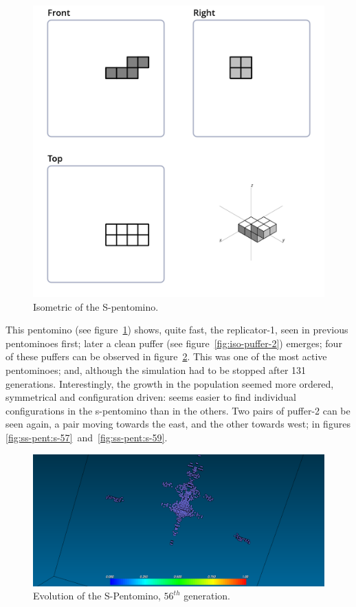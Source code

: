 \begin{figure}[H]
	\centering
	\includegraphics[scale=0.3]{iso_diagrams/s.png}
	\caption{Isometric of the S-pentomino.}
	\label{fig:iso-pent-s}
\end{figure}

This pentomino (see figure~\ref{fig:iso-pent-s}) shows, quite fast, the
replicator-1, seen in previous pentominoes first; later a clean puffer
(see figure~\ref{fig:iso-puffer-2}) emerges; four of these puffers can be
observed in figure~\ref{fig:ss-pent:s-56}. This was one of the most active
pentominoes; and, although the simulation had to be stopped after 131
generations. Interestingly, the growth in the population seemed more ordered,
symmetrical and configuration driven: seems easier to find individual
configurations in the s-pentomino than in the others. Two pairs of puffer-2
can be seen again, a pair moving towards the east, and the other towards west;
in figures \ref{fig:ss-pent:s-57}~and~\ref{fig:ss-pent:s-59}.

\begin{figure}[H]
	\centering
	\includegraphics[scale=0.3]{pentominoes_ss/s_56.png}
	\caption{Evolution of the S-Pentomino, $56^{th}$ generation.}
  \label{fig:ss-pent:s-56}
\end{figure}


